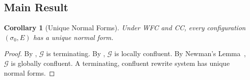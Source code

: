 \documentclass[11pt,a4paper]{article}
\theoremstyle{plain}
\newtheorem{corollary}[theorem]{Corollary}
\theoremstyle{definition}
\theoremstyle{remark}
\begin{document}
\subsection{Main Result}

\begin{corollary}[Unique Normal Forms]
\label{cor:unique-nf}
Under WFC and CC, every configuration $(\sigma_0, E)$ has a unique normal
form.
\end{corollary}
\begin{proof}
By , $\mathcal{G}$ is terminating.  By
, $\mathcal{G}$ is locally confluent.  By Newman's
Lemma~\cite{newman1942}, $\mathcal{G}$ is globally confluent.  A terminating,
confluent rewrite system has unique normal forms.
\end{proof}
\end{document}
